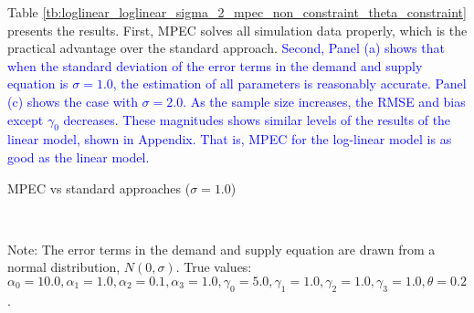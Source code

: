 \documentclass[11pt, a4paper]{article}
\begin{document}
Table \ref{tb:loglinear_loglinear_sigma_2_mpec_non_constraint_theta_constraint} presents the results.
First, MPEC solves all simulation data properly, which is the practical advantage over the standard approach.
\textcolor{blue}{Second, Panel (a) shows that when the standard deviation of the error terms in the demand and supply equation is $\sigma = 1.0$, the estimation of all parameters is reasonably accurate.
Panel (c) shows the case with $\sigma = 2.0$. 
As the sample size increases, the RMSE and bias except $\gamma_0$ decreases. These magnitudes shows similar levels of the results of the linear model, shown in Appendix. 
That is, MPEC for the log-linear model is as good as the linear model.
}


\begin{table}[!htbp]
  \begin{center}
      \caption{MPEC vs standard approaches ($\sigma=1.0$)}
      \label{tb:loglinear_loglinear_sigma_2_mpec_non_constraint_theta_constraint} 
      \subfloat[MPEC]{}\\
      \subfloat[Simultaneous]{}
  \end{center}
  \footnotesize
  Note: The error terms in the demand and supply equation are drawn from a normal distribution, $N(0, \sigma)$. True values: $\alpha_0=10.0,\alpha_1=1.0,\alpha_2=0.1,\alpha_3=1.0,\gamma_0=5.0,\gamma_1=1.0,\gamma_2=1.0,\gamma_3=1.0,\theta=0.2$.
\end{table} 
\end{document}
